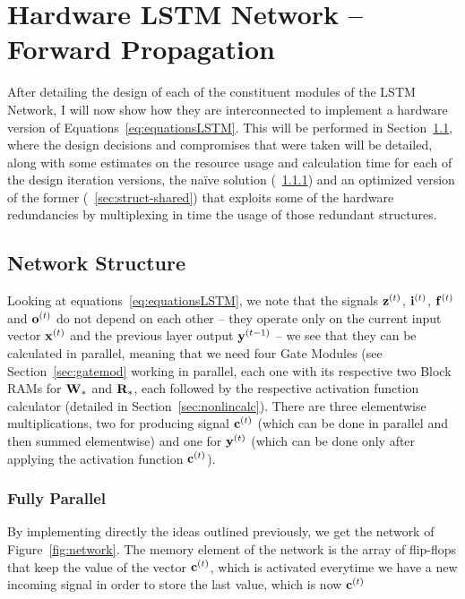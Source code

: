 \section{Hardware LSTM Network -- Forward Propagation}\label{sec:hLSTM-fp}
After detailing the design of each of the constituent modules of the LSTM Network, I will now show how they are interconnected
to implement a hardware version of Equations~\ref{eq:equationsLSTM}. This will be performed in Section~\ref{sec:hLSTM-struct}, where the design decisions and compromises that were taken will be detailed, along with some estimates on the resource usage and calculation time for each of the design iteration versions, the naïve solution (~\ref{sec:struct-fullpar}) and an optimized version of the former (~\ref{sec:struct-shared}) that exploits some of the hardware redundancies by multiplexing in time the usage of those redundant structures.

\subsection{Network Structure}\label{sec:hLSTM-struct}
Looking at equations~\ref{eq:equationsLSTM}, we note that the signals $\mathbf{z}^{(t)}$, $\mathbf{i}^{(t)}$, $\mathbf{f}^{(t)}$ and $\mathbf{o}^{(t)}$ do not depend on each other -- they operate only on the current input vector $\mathbf{x}^{(t)}$ and the previous layer output $\mathbf{y}^{(t-1)}$ -- we see that they can be calculated in parallel, meaning that we need four Gate Modules (see Section~\ref{sec:gatemod} working in parallel, each one with its respective two Block RAMs for $\mathbf{W}_*$ and $\mathbf{R}_*$, each followed by the respective activation function calculator (detailed in Section~\ref{sec:nonlincalc}). There are three elementwise multiplications, two for producing signal $\mathbf{c}^{(t)}$ (which can be done in parallel and then summed elementwise) and one for $\mathbf{y}^{(t)}$ (which can be done only after applying the activation function $\mathbf{c}^{(t)}$).

\subsubsection{Fully Parallel}\label{sec:struct-fullpar}
By implementing directly the ideas outlined previously, we get the network of Figure~\ref{fig:network}. The memory element of the network is the array of flip-flops that keep the value of the vector $\mathbf{c}^{(t)}$, which is activated everytime we have a new incoming signal in order to store the last value, which is now $\mathbf{c}^{(t)}$

